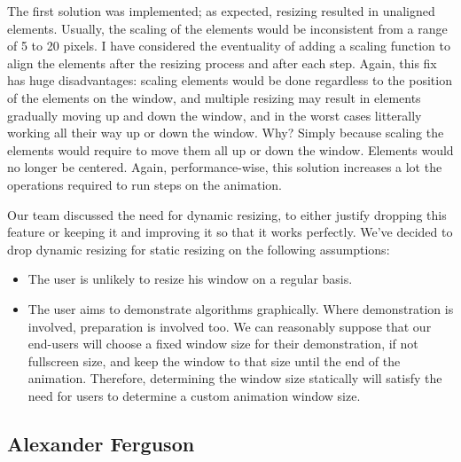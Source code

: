 \documentclass{l3proj}
\begin{document}
The first solution was implemented; as expected, resizing resulted in unaligned elements. Usually, the scaling of the elements would be inconsistent from a range of 5 to 20 pixels.
I have considered the eventuality of adding a scaling function to align the elements after the resizing process and after each step. Again, this fix has huge disadvantages: scaling elements would be done
regardless to the position of the elements on the window, and multiple resizing may result in elements gradually moving up and down the window, and in the worst cases litterally working all their way up or down the window.
Why? Simply because scaling the elements would require to move them all up or down the window. Elements would no longer be centered. 
Again, performance-wise, this solution increases a lot the operations required to run steps on the animation.

Our team discussed the need for dynamic resizing, to either justify dropping this feature or keeping it and improving it so that it works perfectly.
We've decided to drop dynamic resizing for static resizing on the following assumptions:
\begin{itemize}
\item The user is unlikely to resize his window on a regular basis.
\item The user aims to demonstrate algorithms graphically. Where demonstration is involved, preparation is involved too. We can reasonably suppose that our end-users
will choose a fixed window size for their demonstration, if not fullscreen size, and keep the window to that size until the end of the animation. Therefore, determining the window
size statically will satisfy the need for users to determine a custom animation window size. 
\end{itemize}
\subsection{Alexander Ferguson}
\end{document}
